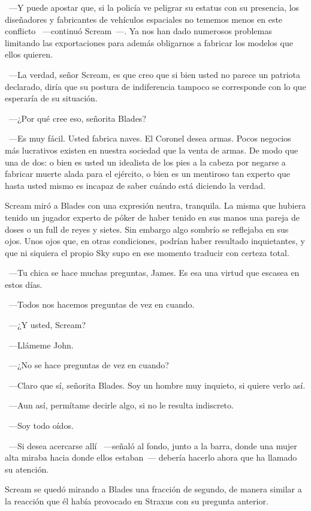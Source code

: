 ~---Y puede apostar que, si la policía ve peligrar su estatus con su presencia, los diseñadores y fabricantes de vehículos espaciales no tememos menos en este conflicto ~---continuó Scream~---. Ya nos han dado numerosos problemas limitando las exportaciones para además obligarnos a fabricar los modelos que ellos quieren.

~---La verdad, señor Scream, es que creo que si bien usted no parece un patriota declarado, diría que su postura de indiferencia tampoco se corresponde con lo que esperaría de su situación.

~---¿Por qué cree eso, señorita Blades?

~---Es muy fácil. Usted fabrica naves. El Coronel desea armas. Pocos negocios más lucrativos existen en nuestra sociedad que la venta de armas. De modo que una de dos: o bien es usted un idealista de los pies a la cabeza por negarse a fabricar muerte alada para el ejército, o bien es un mentiroso tan experto que hasta usted mismo es incapaz de saber cuándo está diciendo la verdad.

Scream miró a Blades con una expresión neutra, tranquila. La misma que hubiera tenido un jugador experto de póker de haber tenido en sus manos una pareja de doses o un full de reyes y sietes. Sin embargo algo sombrío se reflejaba en sus ojos. Unos ojos que, en otras condiciones, podrían haber resultado inquietantes, y que ni siquiera el propio Sky supo en ese momento traducir con certeza total.

~---Tu chica se hace muchas preguntas, James. Es esa una virtud que escasea en estos días.

~---Todos nos hacemos preguntas de vez en cuando.

~---¿Y usted, Scream?

~---Llámeme John.

~---¿No se hace preguntas de vez en cuando?

~---Claro que sí, señorita Blades. Soy un hombre muy inquieto, si quiere verlo así.

~---Aun así, permítame decirle algo, si no le resulta indiscreto.

~---Soy todo oídos.

~---Si desea acercarse allí ~---señaló al fondo, junto a la barra, donde una mujer alta miraba hacia donde ellos estaban~--- debería hacerlo ahora que ha llamado su atención.

Scream se quedó mirando a Blades una fracción de segundo, de manera similar a la reacción que él había provocado en Straxus con su pregunta anterior.

